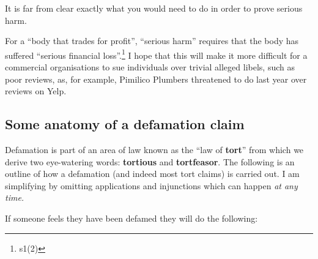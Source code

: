 \documentclass[]{article}
\begin{document}
It is far from clear exactly what you would need to do in order to prove serious harm.

For a ``body that trades for profit'', ``serious harm'' requires that the body has suffered ``serious financial loss''.\footnote{s1(2)} I hope that this will make it more difficult for a commercial organisations to sue individuals over trivial alleged libels, such as poor reviews, as, for example, Pimilico Plumbers threatened to do last year over reviews on Yelp.

\subsection{Some anatomy of a defamation claim}

Defamation is part of an area of law known as the ``law of
\textbf{tort}{'' from which we derive two eye-watering words:
}\textbf{tortious} {and }\textbf{tortfeasor}{. The following is an
outline of how a defamation (and indeed most tort claims) is carried
out. I am simplifying by omitting applications and injunctions which can
happen }\emph{{at any time.}}

If someone feels they have been defamed they will do the following:
\end{document}
